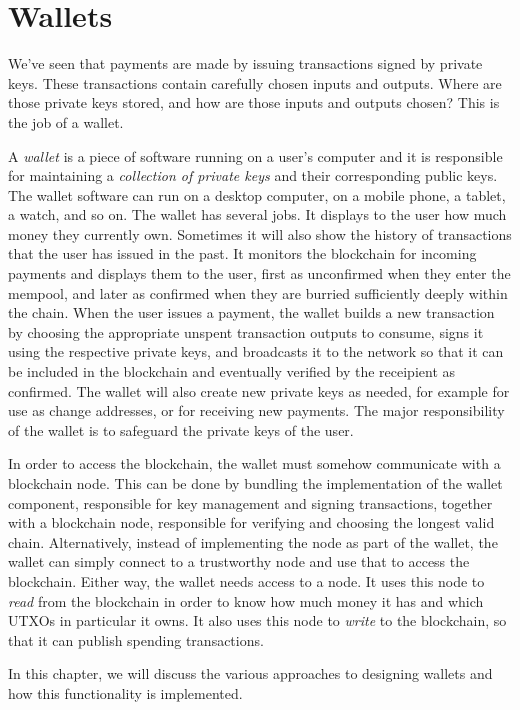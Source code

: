 \chapter{Wallets}

We've seen that payments are made by issuing transactions signed by private keys.
These transactions contain carefully chosen inputs and outputs. Where are those
private keys stored, and how are those inputs and outputs chosen? This is the job
of a wallet.

A \emph{wallet} is a piece of software running on a user's computer and it is
responsible for maintaining a \emph{collection of private keys} and their corresponding
public keys. The wallet software can run on a desktop computer, on a mobile phone,
a tablet, a watch, and so on.
The wallet has several jobs. It displays to the user how much money they
currently own. Sometimes it will also show the history of transactions that the user
has issued in the past. It monitors the blockchain for incoming payments and displays
them to the user, first as unconfirmed when they enter the mempool, and later as confirmed
when they are burried sufficiently deeply within the chain. When the user issues
a payment, the wallet builds a new transaction by choosing the appropriate unspent transaction
outputs to consume, signs it using the respective private keys, and broadcasts it to the
network so that it can be included in the blockchain and eventually verified by the receipient
as confirmed. The wallet will also create new private keys as needed, for example for
use as change addresses, or for receiving new payments. The major responsibility
of the wallet is to safeguard the private keys of the user.

In order to access the blockchain, the wallet must somehow communicate
with a blockchain node. This can be done by bundling the implementation of the
wallet component, responsible for key management and signing transactions, together
with a blockchain node, responsible for verifying and choosing the longest valid chain.
Alternatively, instead of implementing the node as part of the wallet, the
wallet can simply connect to a trustworthy node and use that to access the
blockchain. Either way, the wallet needs access to a node. It uses this node to
\emph{read} from the blockchain in order to know how much money it has and which UTXOs in
particular it owns. It also uses this node to \emph{write} to the blockchain,
so that it can publish spending transactions.

In this chapter, we will discuss the various approaches to designing wallets and how
this functionality is implemented.

